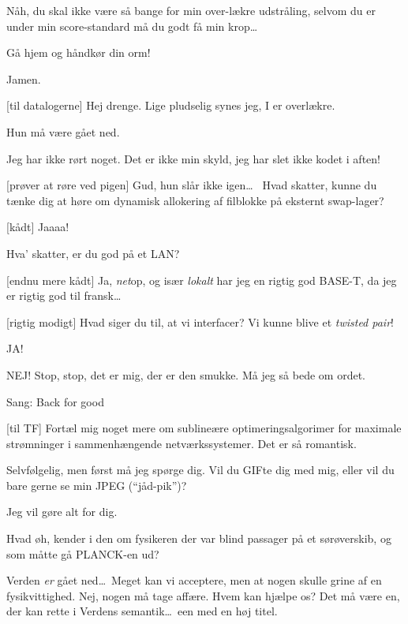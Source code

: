 \documentclass[danish]{article}
\begin{document}
\begin{sketch}
 Nåh, du skal ikke være så bange for min over-lækre
udstråling, selvom du er under min score-standard må du godt få min
krop\ldots

 Gå hjem og håndkør din orm!

 Jamen.

[til datalogerne] Hej drenge. Lige pludselig synes jeg, I
er overlækre. 

 Hun må være gået ned.

 Jeg har ikke rørt noget. Det er ikke min skyld, jeg har slet ikke kodet i aften!

[prøver at røre ved pigen] Gud, hun slår ikke igen\ldots\ 
 Hvad skatter, kunne du tænke dig at høre
om dynamisk allokering af filblokke på eksternt swap-lager?

[kådt] Jaaaa!

 Hva' skatter, er du god på et LAN?

[endnu mere kådt] Ja, \emph{net}op, og især \emph{lokalt} har jeg en rigtig god BASE-T, da jeg er rigtig god til fransk\ldots

[rigtig modigt] Hvad siger du til, at vi interfacer? Vi kunne blive et \emph{twisted pair}!

 JA! 

 NEJ!  Stop, stop, det er mig, der er den smukke.
Må jeg så bede om ordet.

\scene Sang: Back for good

[til TF] Fortæl mig noget mere om sublineære
optimeringsalgorimer for maximale strømninger i sammenhængende
netværkssystemer. Det er så romantisk.

 Selvfølgelig, men først må jeg spørge dig. Vil du GIFte dig med mig,
eller vil du bare gerne se min JPEG (``jåd-pik'')?

 Jeg vil gøre alt for dig.

 Hvad øh, kender i den om fysikeren der var blind passager på et sørøverskib, og som måtte 
gå PLANCK-en ud? \act{Alle griner}

 Verden \emph{er} gået ned\ldots\ Meget kan vi acceptere, men at nogen
skulle grine af en fysikvittighed.  Nej, nogen må tage affære. Hvem kan hjælpe
os? Det må være en, der kan rette i Verdens semantik\ldots\ een med en høj titel.


\end{sketch}
\end{document}
